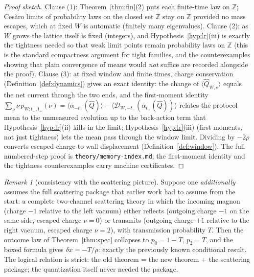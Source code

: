 \documentclass[11pt]{article}
\theoremstyle{definition}
\theoremstyle{remark}
\newtheorem{remark}[theorem]{Remark}
\newcommand{\Z}{\mathbb{Z}}
\begin{document}
\begin{proof}[Proof sketch]
Clause (1): Theorem~\ref{thm:fin}(2) puts each finite-time law on $\Z$;
Ces\`aro limits of probability laws on the closed set $\Z$ stay on $\Z$
provided no mass escapes, which at fixed $W$ is automatic (finitely many
eigenvalues).  Clause (2): as $W$ grows the lattice itself is fixed
(integers), and Hypothesis~\ref{hyp:lr}(iii) is exactly the tightness needed
so that weak limit points remain probability laws on $\Z$ (this is the
standard compactness argument for tight families, and the counterexamples
showing that plain convergence of means would \emph{not} suffice are recorded
alongside the proof).  Clause (3): at fixed window and finite times, charge
conservation (Definition~\ref{def:dynamics}) gives an exact identity: the
change of $\langle\widehat Q_{W,c}\rangle$ equals the net current through the
two ends, and the first-moment identity
$\sum_\nu\nu\,p_{W;t_-,t_+}(\nu)
=\langle\alpha_{-t_-}(\widehat Q)\rangle-
\langle\mathcal{D}_{W,-t_-}(\alpha_{t_+}(\widehat Q))\rangle$
relates the protocol mean to the unmeasured evolution up to the back-action
term that Hypothesis~\ref{hyp:lr}(ii) kills in the limit;
Hypothesis~\ref{hyp:lr}(iii) (first moments, not just tightness) lets the
mean pass through the window limit.  Dividing by $-2\rho$ converts escaped
charge to wall displacement (Definition~\ref{def:window}).  The full
numbered-step proof is \texttt{theory/memory-index.md}; the first-moment
identity and the tightness counterexamples carry machine certificates.
\end{proof}

\begin{remark}[consistency with the scattering picture]\label{rem:consistency}
Suppose one \emph{additionally} assumes the full scattering package that
earlier work had to assume from the start: a complete two-channel scattering
theory in which the incoming magnon (charge $-1$ relative to the left vacuum)
either reflects (outgoing charge $-1$ on the same side, escaped charge
$\nu=0$) or transmits (outgoing charge $+1$ relative to the right vacuum,
escaped charge $\nu=2$), with transmission probability $T$.  Then the outcome
law of Theorem~\ref{thm:spec} collapses to $p_0=1-T$, $p_2=T$, and the boxed
formula gives $\delta x=-T/\rho$: exactly the previously known conditional
result.  The logical relation is strict: the old theorem = the new theorem +
the scattering package; the quantization itself never needed the package.
\end{remark}
\end{document}

